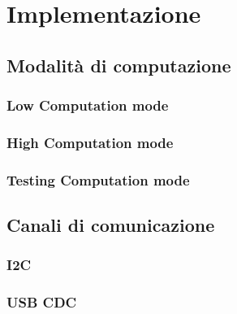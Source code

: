 \chapter{Implementazione}
\label{implementazione}

\section{Modalità di computazione}
\label{computationMode}
\subsection{Low Computation mode}

\subsection{High Computation mode}

\subsection{Testing Computation mode}
\label{tcm}


\section{Canali di comunicazione}

\subsection{I2C}
\label{imp_i2c}

\subsection{USB CDC}
\label{imp_usbcdc}